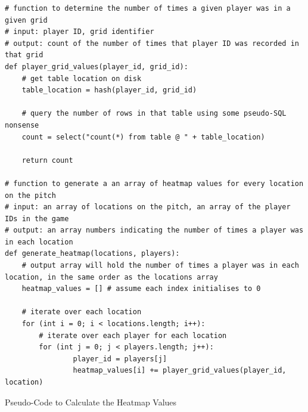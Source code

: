 \documentclass[a4paper,11pt]{article}
\newenvironment{code}{\captionsetup{type=listing}}{}
\begin{document}
\begin{code}
\begin{verbatim}
# function to determine the number of times a given player was in a given grid 
# input: player ID, grid identifier 
# output: count of the number of times that player ID was recorded in that grid
def player_grid_values(player_id, grid_id):
    # get table location on disk
    table_location = hash(player_id, grid_id)

    # query the number of rows in that table using some pseudo-SQL nonsense
    count = select("count(*) from table @ " + table_location)  

    return count

# function to generate a an array of heatmap values for every location on the pitch
# input: an array of locations on the pitch, an array of the player IDs in the game
# output: an array numbers indicating the number of times a player was in each location
def generate_heatmap(locations, players):
    # output array will hold the number of times a player was in each location, in the same order as the locations array
    heatmap_values = [] # assume each index initialises to 0

    # iterate over each location
    for (int i = 0; i < locations.length; i++):
        # iterate over each player for each location
        for (int j = 0; j < players.length; j++):
                player_id = players[j]
                heatmap_values[i] += player_grid_values(player_id, location)  
\end{verbatim}
\caption{Pseudo-Code to Calculate the Heatmap Values}
\end{code}
\end{document}

